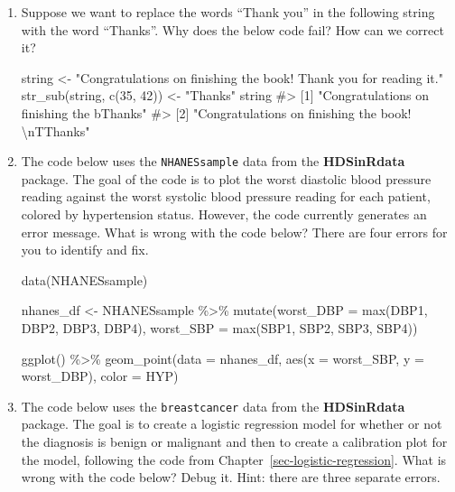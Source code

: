 \documentclass[
  letterpaper,
]{krantz}
\makeatletter
\newenvironment{Shaded}{\begin{snugshade}}{\end{snugshade}}
\newcommand{\AttributeTok}[1]{\textcolor[rgb]{0.40,0.45,0.13}{#1}}
\newcommand{\CommentTok}[1]{\textcolor[rgb]{0.37,0.37,0.37}{#1}}
\newcommand{\DecValTok}[1]{\textcolor[rgb]{0.68,0.00,0.00}{#1}}
\newcommand{\FunctionTok}[1]{\textcolor[rgb]{0.28,0.35,0.67}{#1}}
\newcommand{\NormalTok}[1]{\textcolor[rgb]{0.00,0.23,0.31}{#1}}
\newcommand{\OtherTok}[1]{\textcolor[rgb]{0.00,0.23,0.31}{#1}}
\newcommand{\SpecialCharTok}[1]{\textcolor[rgb]{0.37,0.37,0.37}{#1}}
\newcommand{\StringTok}[1]{\textcolor[rgb]{0.13,0.47,0.30}{#1}}
\newenvironment{kframe}{%
\medskip{}
\setlength{\fboxsep}{.8em}
 \def\at@end@of@kframe{}%
 \ifinner\ifhmode%
  \def\at@end@of@kframe{\end{minipage}}%
  \begin{minipage}{\columnwidth}%
 \fi\fi%
 \def\FrameCommand##1{\hskip\@totalleftmargin \hskip-\fboxsep
 \colorbox{shadecolor}{##1}\hskip-\fboxsep
     \hskip-\linewidth \hskip-\@totalleftmargin \hskip\columnwidth}%
 \MakeFramed {\advance\hsize-\width
   \@totalleftmargin\z@ \linewidth\hsize
   \@setminipage}}%
 {\par\unskip\endMakeFramed%
 \at@end@of@kframe}
\renewenvironment{Shaded}{\begin{kframe}}{\end{kframe}}
\makeatother
\begin{document}
\begin{enumerate}
\def\labelenumi{\arabic{enumi}.}
\item
  Suppose we want to replace the words ``Thank you'' in the following
  string with the word ``Thanks''. Why does the below code fail? How can
  we correct it?

\begin{Shaded}
\begin{Highlighting}[]
\NormalTok{string }\OtherTok{\textless{}{-}} \StringTok{"Congratulations on finishing the book! }
\StringTok{Thank you for reading it."}
\FunctionTok{str\_sub}\NormalTok{(string, }\FunctionTok{c}\NormalTok{(}\DecValTok{35}\NormalTok{, }\DecValTok{42}\NormalTok{)) }\OtherTok{\textless{}{-}} \StringTok{"Thanks"}
\NormalTok{string}
\CommentTok{\#\textgreater{} [1] "Congratulations on finishing the bThanks"        }
\CommentTok{\#\textgreater{} [2] "Congratulations on finishing the book! \textbackslash{}nTThanks"}
\end{Highlighting}
\end{Shaded}
\item
  The code below uses the \texttt{NHANESsample} data from the
  \textbf{HDSinRdata} package. The goal of the code is to plot the worst
  diastolic blood pressure reading against the worst systolic blood
  pressure reading for each patient, colored by hypertension status.
  However, the code currently generates an error message. What is wrong
  with the code below? There are four errors for you to identify and
  fix.

\begin{Shaded}
\begin{Highlighting}[]
\FunctionTok{data}\NormalTok{(NHANESsample)}

\NormalTok{nhanes\_df }\OtherTok{\textless{}{-}}\NormalTok{ NHANESsample }\SpecialCharTok{\%\textgreater{}\%} 
  \FunctionTok{mutate}\NormalTok{(}\AttributeTok{worst\_DBP =} \FunctionTok{max}\NormalTok{(DBP1, DBP2, DBP3, DBP4), }
     \AttributeTok{worst\_SBP =} \FunctionTok{max}\NormalTok{(SBP1, SBP2, SBP3, SBP4))}

\FunctionTok{ggplot}\NormalTok{() }\SpecialCharTok{\%\textgreater{}\%} 
  \FunctionTok{geom\_point}\NormalTok{(}\AttributeTok{data =}\NormalTok{ nhanes\_df, }\FunctionTok{aes}\NormalTok{(}\AttributeTok{x =}\NormalTok{ worst\_SBP, }\AttributeTok{y =}\NormalTok{ worst\_DBP), }
         \AttributeTok{color =}\NormalTok{ HYP)}
\end{Highlighting}
\end{Shaded}
\item
  The code below uses the \texttt{breastcancer} data from the
  \textbf{HDSinRdata} package. The goal is to create a logistic
  regression model for whether or not the diagnosis is benign or
  malignant and then to create a calibration plot for the model,
  following the code from Chapter~\ref{sec-logistic-regression}. What is
  wrong with the code below? Debug it. Hint: there are three separate
  errors.


\end{enumerate}
\end{document}
